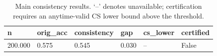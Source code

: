 \begin{table}[t]
\centering
\begin{tabular}{llllll}
\toprule
n & orig_acc & consistency & gap & cs_lower & certified \\
\midrule
200.000 & 0.575 & 0.545 & 0.030 & -- & False \\
\bottomrule
\end{tabular}
\caption{Main consistency results. `--' denotes unavailable; certification requires an anytime-valid CS lower bound above the threshold.}
\end{table}
